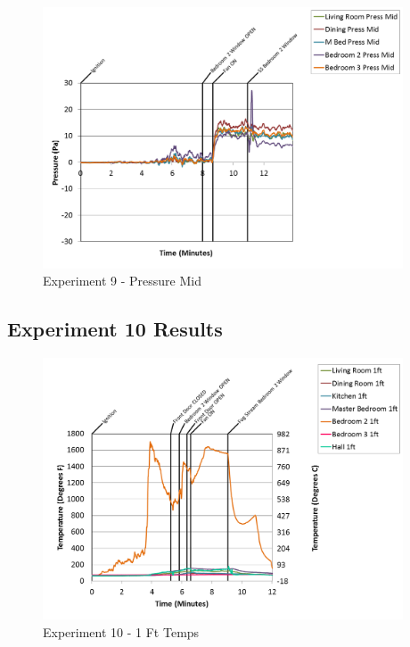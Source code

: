 \documentclass{article}
\begin{document}
\begin{appendices}
\begin{figure}[h!]
	\centering
	\includegraphics[height=3.05in]{0_Images/Results_Charts/Exp_9_Charts/PressureMid.png}
	\caption{Experiment 9 - Pressure Mid}
\end{figure}

\clearpage

\clearpage
\clearpage		\large
\subsection{Experiment 10 Results} \label{App:Exp10Results} 

\begin{figure}[h!]
	\centering
	\includegraphics[height=3.05in]{0_Images/Results_Charts/Exp_10_Charts/1FtTemps.png}
	\caption{Experiment 10 - 1 Ft Temps}
\end{figure}



\end{appendices}
\end{document}
